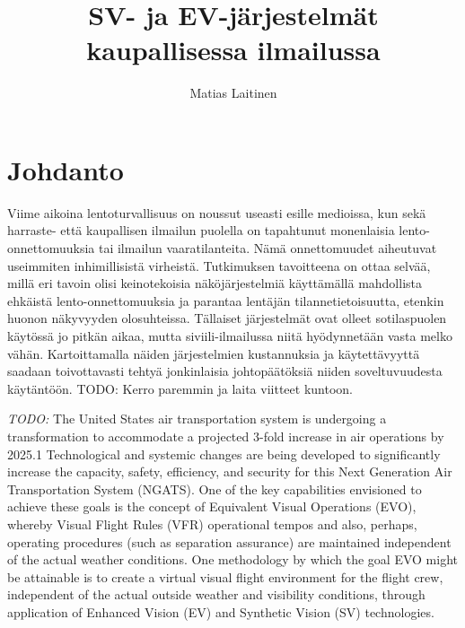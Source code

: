 \documentclass[utf8,bachelor,manualbib]{gradu3}
\begin{document}
\title{SV- ja EV-järjestelmät kaupallisessa ilmailussa}



\author{Matias Laitinen}

\maketitle
  
\mainmatter

\chapter{Johdanto}

Viime aikoina lentoturvallisuus on noussut useasti esille medioissa, kun sekä harraste- että kaupallisen ilmailun puolella on tapahtunut monenlaisia lento-onnettomuuksia tai ilmailun vaaratilanteita. Nämä onnettomuudet aiheutuvat useimmiten inhimillisistä virheistä. Tutkimuksen tavoitteena on ottaa selvää, millä eri tavoin olisi keinotekoisia näköjärjestelmiä käyttämällä mahdollista ehkäistä lento-onnettomuuksia ja parantaa lentäjän tilannetietoisuutta, etenkin huonon näkyvyyden olosuhteissa. Tällaiset järjestelmät ovat olleet sotilaspuolen käytössä jo pitkän aikaa, mutta siviili-ilmailussa niitä hyödynnetään vasta melko vähän. Kartoittamalla näiden järjestelmien kustannuksia ja käytettävyyttä saadaan toivottavasti tehtyä jonkinlaisia johtopäätöksiä niiden soveltuvuudesta käytäntöön. TODO: Kerro paremmin ja laita viitteet kuntoon.

\emph{TODO:}
The United States air transportation system is undergoing a transformation to accommodate a projected 3-fold
increase in air operations by 2025.1 Technological and systemic changes are being developed to significantly
increase the capacity, safety, efficiency, and security for this Next Generation Air Transportation System
(NGATS). One of the key capabilities envisioned to achieve these goals is the concept of Equivalent Visual
Operations (EVO), whereby Visual Flight Rules (VFR) operational tempos and also, perhaps, operating
procedures (such as separation assurance) are maintained independent of the actual weather conditions. One
methodology by which the goal EVO might be attainable is to create a virtual visual flight environment for
the flight crew, independent of the actual outside weather and visibility conditions, through application of
Enhanced Vision (EV) and Synthetic Vision (SV) technologies. \citep{baileyym2007}
\end{document}
